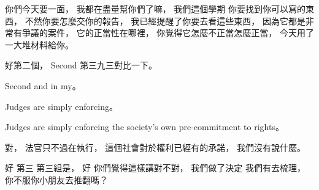 \hypertarget{w06:cue:2812}{}你們今天要一面，
\hypertarget{w06:cue:2813}{}我都在盡量幫你們了嘛，
\hypertarget{w06:cue:2814}{}我們這個學期 你要找到你可以寫的東西，
\hypertarget{w06:cue:2815}{}不然你要怎麼交你的報告，
\hypertarget{w06:cue:2816}{}我已經提醒了你要去看這些東西，
\hypertarget{w06:cue:2817}{}因為它都是非常有爭議的案件，
\hypertarget{w06:cue:2818}{}它的正當性在哪裡，
\hypertarget{w06:cue:2819}{}你覺得它怎麼不正當怎麼正當，
\hypertarget{w06:cue:2820}{}今天用了一大堆材料給你。

\hypertarget{w06:cue:2821}{}好第二個，
\hypertarget{w06:cue:2822}{}Second
\hypertarget{w06:cue:2823}{}第三九三對比一下。

\hypertarget{w06:cue:2824}{}Second and in my。

\hypertarget{w06:cue:2825}{}Judges are simply enforcing。

\hypertarget{w06:cue:2826}{}Judges are simply enforcing the society's own pre-commitment to rights。

\hypertarget{w06:cue:2827}{}對，
\hypertarget{w06:cue:2828}{}法官只不過在執行，
\hypertarget{w06:cue:2829}{}這個社會對於權利已經有的承諾，
\hypertarget{w06:cue:2830}{}我們沒有說什麼。

\hypertarget{w06:cue:2831}{}好 第三 第三組是，
\hypertarget{w06:cue:2832}{}好 你們覺得這樣講對不對，
\hypertarget{w06:cue:2833}{}我們做了決定 我們有去梳理，
\hypertarget{w06:cue:2834}{}你不服你小朋友去推翻嗎？

